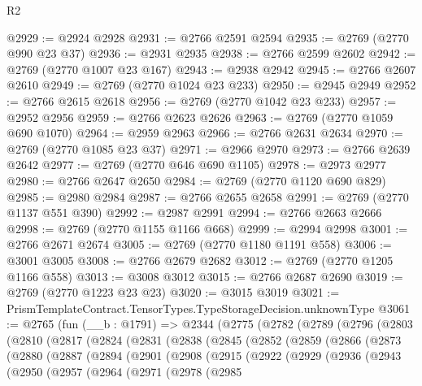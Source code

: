 \begin{lexlean}{R2}
\begin{coremodule}
@2929 := @2924 @2928
@2931 := @2766 @2591 @2594
@2935 := @2769 (@2770 @990 @23 @37)
@2936 := @2931 @2935
@2938 := @2766 @2599 @2602
@2942 := @2769 (@2770 @1007 @23 @167)
@2943 := @2938 @2942
@2945 := @2766 @2607 @2610
@2949 := @2769 (@2770 @1024 @23 @233)
@2950 := @2945 @2949
@2952 := @2766 @2615 @2618
@2956 := @2769 (@2770 @1042 @23 @233)
@2957 := @2952 @2956
@2959 := @2766 @2623 @2626
@2963 := @2769 (@2770 @1059 @690 @1070)
@2964 := @2959 @2963
@2966 := @2766 @2631 @2634
@2970 := @2769 (@2770 @1085 @23 @37)
@2971 := @2966 @2970
@2973 := @2766 @2639 @2642
@2977 := @2769 (@2770 @646 @690 @1105)
@2978 := @2973 @2977
@2980 := @2766 @2647 @2650
@2984 := @2769 (@2770 @1120 @690 @829)
@2985 := @2980 @2984
@2987 := @2766 @2655 @2658
@2991 := @2769 (@2770 @1137 @551 @390)
@2992 := @2987 @2991
@2994 := @2766 @2663 @2666
@2998 := @2769 (@2770 @1155 @1166 @668)
@2999 := @2994 @2998
@3001 := @2766 @2671 @2674
@3005 := @2769 (@2770 @1180 @1191 @558)
@3006 := @3001 @3005
@3008 := @2766 @2679 @2682
@3012 := @2769 (@2770 @1205 @1166 @558)
@3013 := @3008 @3012
@3015 := @2766 @2687 @2690
@3019 := @2769 (@2770 @1223 @23 @23)
@3020 := @3015 @3019
@3021 := PrismTemplateContract.TensorTypes.TypeStorageDecision.unknownType
@3061 := @2765
    (fun (__b : @1791) =>
    @2344
      (@2775
        (@2782
          (@2789
            (@2796
              (@2803
                (@2810
                  (@2817
                    (@2824
                      (@2831
                        (@2838
                          (@2845
                            (@2852
                              (@2859
                                (@2866
                                  (@2873
                                    (@2880
                                      (@2887
                                        (@2894
                                          (@2901
                                            (@2908
                                              (@2915
                                                (@2922
                                                  (@2929
                                                    (@2936
                                                      (@2943
                                                        (@2950
                                                          (@2957
                                                            (@2964
                                                              (@2971
                                                                (@2978
                                                                  (@2985

\end{coremodule}
\end{lexlean}
